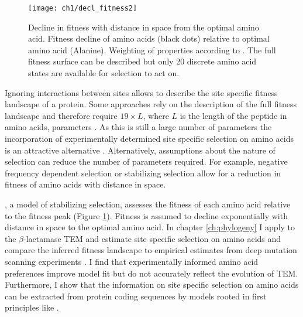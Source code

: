 \singlespacing
\begin{figure}
     \centering
	\texttt{[image: ch1/decl\_fitness2]}
	\caption{Decline in fitness with distance in \PC space from the optimal amino acid. 
	Fitness decline of amino acids (black dots) relative to optimal amino acid (Alanine). Weighting of \PC properties according to \citet{grantham1974}.
	The full fitness surface can be described but only 20 discrete amino acid states are available for selection to act on.}
	\label{fig:decl_fit}
\end{figure}
\doublespacing

Ignoring interactions between sites allows to describe the site specific fitness landscape of a protein.
Some approaches rely on the description of the full fitness landscape and therefore require $19 \times L$, where $L$ is the length of the peptide in amino acids, parameters \citep{LartillotAndPhilippe2004,le2008,wang2008,holder2008,wu2013,tamuri2014}.
As this is still a large number of parameters the incorporation of experimentally determined site specific selection on amino acids is an attractive alternative \citep{bloom2014, thyagarajan2014, bloom2017}. 
Alternatively, assumptions about the nature of selection can reduce the number of parameters required.
For example, negative frequency dependent selection \citep{GoldmanAndYang1994, MuseAndGaut1994, thorne1996} or stabilizing selection \citep{beaulieu2019} allow for a reduction in fitness of amino acids with distance in \PC space.

\selac \citep{beaulieu2019}, a model of stabilizing selection, assesses the fitness of each amino acid relative to the fitness peak (Figure \ref{fig:decl_fit}).
Fitness is assumed to decline exponentially with distance in \PC space to the optimal amino acid.
In chapter \ref{ch:phylogeny} I apply \selac to the $\beta$-lactamase TEM and estimate site specific selection on amino acids and compare the inferred fitness landscape to empirical estimates from deep mutation scanning experiments \citep{stiffler2016}.
I find that experimentally informed amino acid preferences improve model fit but do not accurately reflect the evolution of TEM.
Furthermore, I show that the information on site specific selection on amino acids can be extracted from protein coding sequences by models rooted in first principles like \selac.




